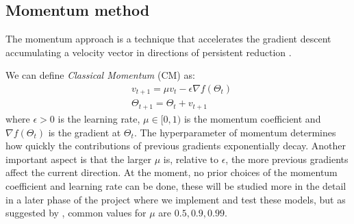 \subsection{Momentum method}
The momentum approach is a technique that accelerates the gradient descent accumulating a velocity vector in directions of persistent reduction \cite{momentum}.

We can define \textit{Classical Momentum} (CM) as:
\begin{align}
    & v_{t+1} = \mu v_t - \epsilon \nabla f(\Theta_t) \\
    & \Theta_{t+1} = \Theta_t + v_{t+1}
\end{align}
where $\epsilon > 0$ is the learning rate, $\mu \in [0,1)$ is the momentum coefficient and $\nabla f(\Theta_t)$ is the gradient at $\Theta_t$. The hyperparameter of momentum determines how quickly the contributions of previous gradients exponentially decay.  Another important aspect is that the larger $\mu$ is, relative to $\epsilon$, the more previous gradients affect the current direction. At the moment, no prior choices of the momentum coefficient and learning rate can be done, these will be studied more in the detail in a later phase of the project where we implement and test these models, but as suggested by \parencite[Chap. 8]{bengio}, common values for $\mu$ are $0.5, 0.9, 0.99$.

